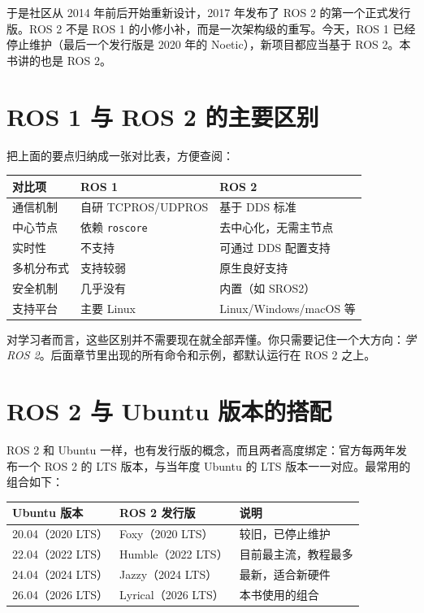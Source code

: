 \documentclass[12pt,a4paper]{ctexbook}
\begin{document}
于是社区从 2014 年前后开始重新设计，2017 年发布了 ROS 2 的第一个正式发行版。ROS 2 不是 ROS 1 的小修小补，而是一次架构级的重写。今天，ROS 1 已经停止维护（最后一个发行版是 2020 年的 Noetic），新项目都应当基于 ROS 2。本书讲的也是 ROS 2。

\section{ROS 1 与 ROS 2 的主要区别}

把上面的要点归纳成一张对比表，方便查阅：

\begin{center}
\begin{tabular}{|l|l|l|}
\hline
\textbf{对比项} & \textbf{ROS 1} & \textbf{ROS 2} \\
\hline
通信机制 & 自研 TCPROS/UDPROS & 基于 DDS 标准 \\
中心节点 & 依赖 \texttt{roscore} & 去中心化，无需主节点 \\
实时性 & 不支持 & 可通过 DDS 配置支持 \\
多机分布式 & 支持较弱 & 原生良好支持 \\
安全机制 & 几乎没有 & 内置（如 SROS2） \\
支持平台 & 主要 Linux & Linux/Windows/macOS 等 \\
\hline
\end{tabular}
\end{center}

对学习者而言，这些区别并不需要现在就全部弄懂。你只需要记住一个大方向：\emph{学 ROS 2}。后面章节里出现的所有命令和示例，都默认运行在 ROS 2 之上。

\section{ROS 2 与 Ubuntu 版本的搭配}

ROS 2 和 Ubuntu 一样，也有发行版的概念，而且两者高度绑定：官方每两年发布一个 ROS 2 的 LTS 版本，与当年度 Ubuntu 的 LTS 版本一一对应。最常用的组合如下：

\begin{center}
\begin{tabular}{|l|l|l|}
\hline
\textbf{Ubuntu 版本} & \textbf{ROS 2 发行版} & \textbf{说明} \\
\hline
20.04（2020 LTS） & Foxy（2020 LTS） & 较旧，已停止维护 \\
22.04（2022 LTS） & Humble（2022 LTS） & 目前最主流，教程最多 \\
24.04（2024 LTS） & Jazzy（2024 LTS） & 最新，适合新硬件 \\
26.04（2026 LTS） & Lyrical（2026 LTS） & 本书使用的组合 \\
\hline
\end{tabular}
\end{center}
\end{document}
